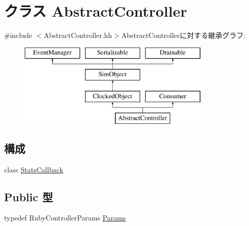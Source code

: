 \hypertarget{classAbstractController}{
\section{クラス AbstractController}
\label{classAbstractController}
}


{\ttfamily \#include $<$AbstractController.hh$>$}AbstractControllerに対する継承グラフ:\begin{figure}[H]
\begin{center}
\leavevmode
\includegraphics[height=4cm]{classAbstractController}
\end{center}
\end{figure}
\subsection*{構成}
\begin{DoxyCompactItemize}
\item 
class \hyperlink{classAbstractController_1_1StatsCallback}{StatsCallback}
\end{DoxyCompactItemize}
\subsection*{Public 型}
\begin{DoxyCompactItemize}
\item 
typedef RubyControllerParams \hyperlink{classAbstractController_a8dd24df4fce13403813bb4f7243a3b13}{Params}
\end{DoxyCompactItemize}
